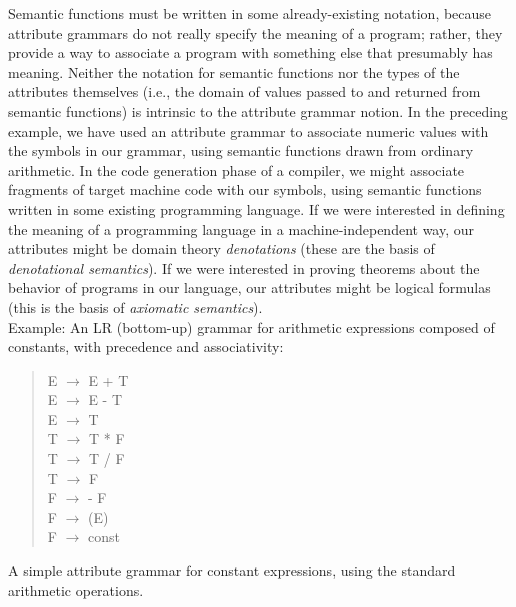 \documentclass[a4paper,12pt]{article}
\begin{document}
Semantic functions must be written in some already-existing notation, because
attribute grammars do not really specify the meaning of a program; rather, they provide a way to associate a program with something else that presumably has meaning. Neither the notation for semantic functions nor the types of the attributes themselves (i.e., the domain of values passed to and returned from semantic functions) is intrinsic to the attribute grammar notion. In the preceding example, we have used an attribute grammar to associate numeric values with the symbols in our grammar, using semantic functions drawn from ordinary arithmetic. In the code generation phase of a compiler, we might associate fragments of target machine code with our symbols, using semantic functions written in some existing programming language. If we were interested in defining the meaning of a programming language in a machine-independent way, our attributes might be domain theory \textit{denotations} (these are the basis of \textit{denotational semantics}). If we were interested in proving theorems about the behavior of programs in our language, our attributes might be logical formulas (this is the basis of \textit{axiomatic semantics}).\\
Example: An LR (bottom-up) grammar for arithmetic expressions composed of constants, with precedence and associativity:\\
\begin{quote}
E $\longrightarrow$ E  + T\\
E $\longrightarrow$ E  - T\\
E $\longrightarrow$ T\\
T $\longrightarrow$ T  * F\\
T $\longrightarrow$ T  / F\\
T $\longrightarrow$  F\\
F $\longrightarrow$ - F\\
F $\longrightarrow$ (E)\\
F $\longrightarrow$ const\\
\end{quote}
A simple attribute grammar for constant expressions, using the standard arithmetic operations.\\
\end{document}
